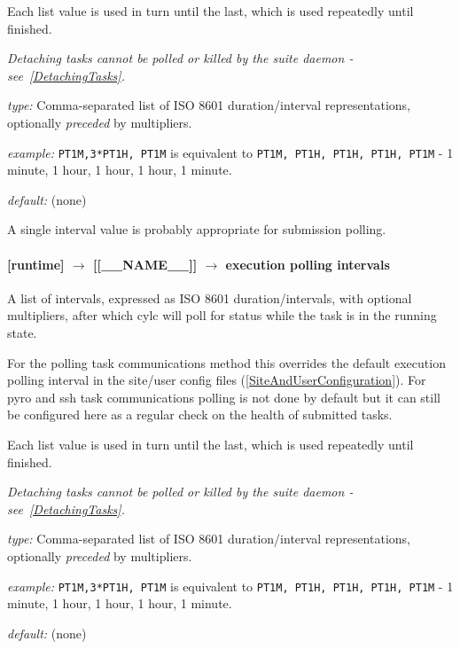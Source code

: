Each list value is used in turn until the last, which is used repeatedly
until finished.

{\em Detaching tasks cannot be polled or killed by the suite daemon -
see~\ref{DetachingTasks}.}

\begin{myitemize}
    \item {\em type:} Comma-separated list of ISO 8601 duration/interval
        representations, optionally {\em preceded} by multipliers.
    \item {\em example:} \lstinline=PT1M,3*PT1H, PT1M= is equivalent to
    \lstinline=PT1M, PT1H, PT1H, PT1H, PT1M= - 1 minute, 1 hour, 1 hour, 1
    hour, 1 minute.
    \item {\em default:} (none)
\end{myitemize}
A single interval value is probably appropriate for submission polling.

\paragraph[execution polling intervals]{[runtime] $\rightarrow$ [[\_\_NAME\_\_]] $\rightarrow$ execution polling intervals}
\label{ExecutionPollingIntervals}

A list of intervals, expressed as ISO 8601 duration/intervals, with optional
multipliers, after which cylc will poll for status while the task is in the
running state.

For the polling task communications method this overrides the default
execution polling interval in the site/user config files
(\ref{SiteAndUserConfiguration}). For pyro and ssh task communications
polling is not done by default but it can still be configured here as a
regular check on the health of submitted tasks.

Each list value is used in turn until the last, which is used repeatedly
until finished.

{\em Detaching tasks cannot be polled or killed by the suite daemon -
see~\ref{DetachingTasks}.}

\begin{myitemize}
    \item {\em type:} Comma-separated list of ISO 8601 duration/interval
        representations, optionally {\em preceded} by multipliers.
    \item {\em example:} \lstinline=PT1M,3*PT1H, PT1M= is equivalent to
    \lstinline=PT1M, PT1H, PT1H, PT1H, PT1M= - 1 minute, 1 hour, 1 hour, 1
    hour, 1 minute.
    \item {\em default:} (none)
\end{myitemize}

